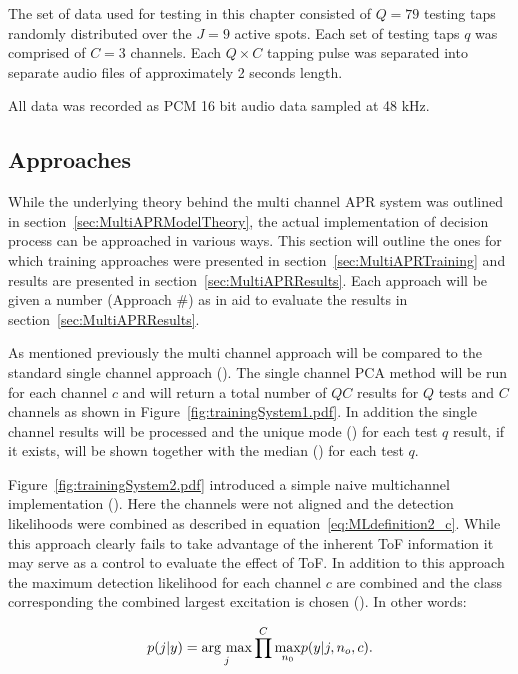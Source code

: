 The set of data used for testing in this chapter consisted of $Q=79$ testing taps randomly distributed over the $J=9$ active spots. Each set of testing taps $q$ was comprised of $C=3$ channels. Each $Q \times C$ tapping pulse was separated into separate audio files of approximately 2 seconds length.

All data was recorded as PCM 16 bit audio data sampled at 48 kHz.

\subsection{Approaches}
While the underlying theory behind the multi channel APR system was outlined in section~\ref{sec:MultiAPRModelTheory}, the actual implementation of decision process can be approached in various ways. This section will outline the ones for which training approaches were presented in section~\ref{sec:MultiAPRTraining} and results are presented in section~\ref{sec:MultiAPRResults}. Each approach will be given a number (Approach \#) as in aid to evaluate the results in section~\ref{sec:MultiAPRResults}.

As mentioned previously the multi channel approach will be compared to the standard single channel approach (). The single channel PCA method will be run for each channel $c$ and will return a total number of $QC$ results for $Q$ tests and $C$ channels as shown in Figure~\ref{fig:trainingSystem1.pdf}. In addition the single channel results will be processed and the unique mode () for each test $q$ result, if it exists, will be shown together with the median () for each test $q$.

Figure~\ref{fig:trainingSystem2.pdf} introduced a simple naive multichannel implementation (). Here the channels were not aligned and the detection likelihoods were combined as described in equation~\ref{eq:MLdefinition2_c}. While this approach clearly fails to take advantage of the inherent ToF information it may serve as a control to evaluate the effect of ToF. In addition to this approach the maximum detection likelihood for each channel $c$ are combined and the class corresponding the combined largest excitation is chosen (). In other words:

\begin{equation}\label{eq:jointprob3_c}
p(j|y) = \underset{j}{\mathrm{arg~max}} \prod^C \underset{n_0}{\max} p(y|j,n_o,c).
\end{equation}

